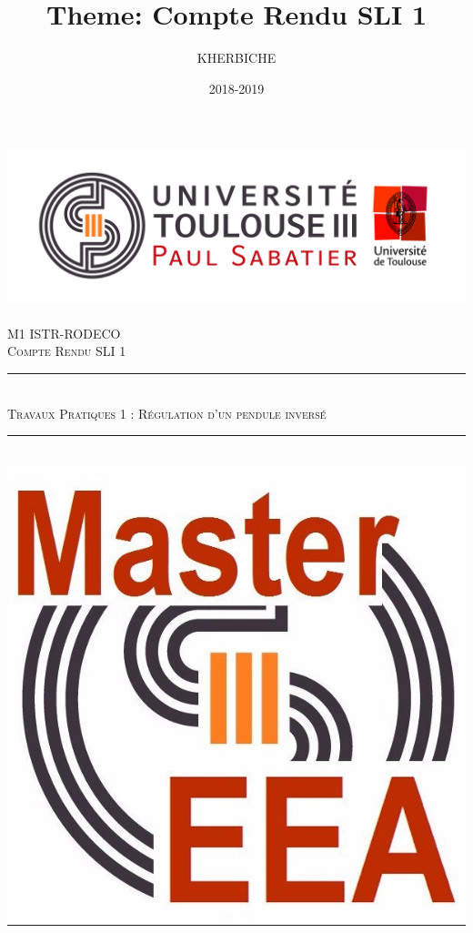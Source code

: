 \documentclass[12pt, a4paper, openany]{report}
\title{Theme: Compte Rendu SLI 1}
\author{KHERBICHE \bsc{Ali}}
\date{2018-2019}
\newcommand{\HRule}{\rule{\linewidth}{0.5mm}}
\begin{document}

\makeatletter
  \begin{titlepage}
  

  \begin{sffamily}
   \begin{center}

    \includegraphics[scale=0.5]{Logo_UT3.jpg}~\\[1.5cm]

    \textsc{\LARGE M1 ISTR-RODECO  }\\[2cm]

    \textsc{\Large Compte Rendu SLI 1}\\[1.5cm]

    \HRule \\[0.4cm] %
    { \huge  \textsc {Travaux Pratiques 1 : Régulation d'un pendule inversé\\[0.4cm] }}

    \HRule \\[1cm]   %
    \includegraphics[scale=0.1]{logomaster.jpg}
    \\[1cm]


\end{center}
\end{sffamily}
\end{titlepage}
\end{document}

